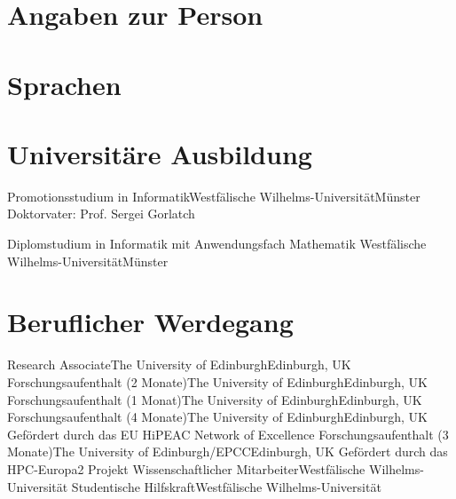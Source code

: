 \documentclass[11pt,a4paper]{moderncv}
\begin{document}
\nocite{*} %
\maketitle
\vspace{-1em}
\begin{minipage}[t]{0.5\textwidth}
  \section{Angaben zur Person}
\end{minipage}
\begin{minipage}[t]{.5\textwidth}
  \section{Sprachen}
\end{minipage}

\section{Universitäre Ausbildung}
        {Promotionsstudium in Informatik}{Westfälische Wilhelms-Universität}{Münster}{}
        {Doktorvater: Prof. Sergei Gorlatch}

        {Diplomstudium in Informatik mit Anwendungsfach Mathematik}
        {Westfälische Wilhelms-Universität}{Münster}{}{}


\section{Beruflicher Werdegang}
        {Research Associate}{The University of Edinburgh}{Edinburgh, UK}{}{}
        {\vspace{0em}Forschungsaufenthalt (2 Monate)}{The University of Edinburgh}{Edinburgh, UK}{}{}
        {Forschungsaufenthalt (1 Monat)}{The University of Edinburgh}{Edinburgh, UK}{}{}
        {Forschungsaufenthalt (4 Monate)}{The University of Edinburgh}{Edinburgh, UK}{}
        {Gefördert durch das EU HiPEAC Network of Excellence}
        {Forschungsaufenthalt (3 Monate)}{The University of Edinburgh/EPCC}{Edinburgh, UK}{}
        {Gefördert durch das HPC-Europa2 Projekt}
        {Wissenschaftlicher Mitarbeiter}{Westfälische Wilhelms-Universität}{}{}{}
        {Studentische Hilfskraft}{Westfälische Wilhelms-Universität}{}{}{}
\end{document}
